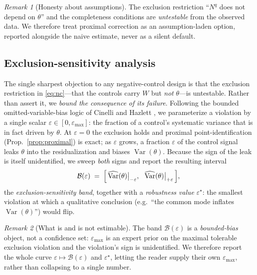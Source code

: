 \documentclass[11pt]{article}
\theoremstyle{definition}
\theoremstyle{remark}
\newtheorem{remark}{Remark}
\newcommand{\Var}{\operatorname{Var}}
\newcommand{\eps}{\varepsilon}
\begin{document}
\begin{remark}[Honesty about assumptions]
The exclusion restriction ``$N^q$ does not depend on $\theta$'' and the
completeness conditions are \emph{untestable} from the observed data. We
therefore treat proximal correction as an assumption-laden option, reported
alongside the naive estimate, never as a silent default.
\end{remark}

\subsection{Exclusion-sensitivity analysis}\label{sec:exclusion}

The single sharpest objection to any negative-control design is that the
exclusion restriction in \eqref{eq:nc}---that the controls carry $W$ but
\emph{not} $\theta$---is untestable. Rather than assert it, we \emph{bound the
consequence of its failure}. Following the bounded omitted-variable-bias logic
of Cinelli and Hazlett \cite{cinelli2020}, we parameterize a violation by a
single scalar $\eps\in[0,\eps_{\max}]$: the fraction of a control's systematic
variance that is in fact driven by $\theta$. At $\eps=0$ the exclusion holds
and proximal point-identification (Prop.~\ref{prop:proximal}) is exact; as
$\eps$ grows, a fraction $\eps$ of the control signal leaks $\theta$ into the
residualization and biases $\Var(\theta)$. Because the sign of the leak is
itself unidentified, we sweep \emph{both} signs and report the resulting
interval
\begin{equation}\label{eq:exclband}
\mathcal{B}(\eps) \;=\; \Bigl[\, \widehat{\Var}(\theta)\big|_{-\eps},\ \
\widehat{\Var}(\theta)\big|_{+\eps} \,\Bigr],
\end{equation}
the \emph{exclusion-sensitivity band}, together with a \emph{robustness value}
$\eps^\star$: the smallest violation at which a qualitative conclusion (e.g.\
``the common mode inflates $\Var(\theta)$'') would flip.

\begin{remark}[What is and is not estimable]
The band $\mathcal{B}(\eps)$ is a \emph{bounded-bias} object, not a confidence
set: $\eps_{\max}$ is an expert prior on the maximal tolerable exclusion
violation and the violation's sign is unidentified. We therefore report the
whole curve $\eps\mapsto\mathcal{B}(\eps)$ and $\eps^\star$, letting the reader
supply their own $\eps_{\max}$, rather than collapsing to a single number.
\end{remark}
\end{document}
